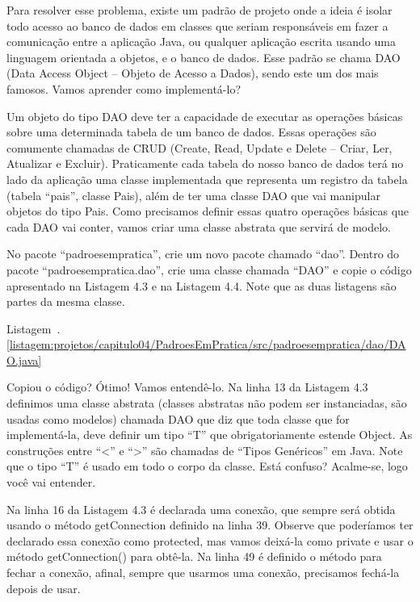 Para resolver esse problema, existe um padrão de projeto onde a ideia é isolar todo acesso ao banco de dados em classes que seriam responsáveis em fazer a comunicação entre a aplicação Java, ou qualquer aplicação escrita usando uma linguagem orientada a objetos, e o banco de dados. Esse padrão se chama DAO (Data Access Object – Objeto de Acesso a Dados), sendo este um dos mais famosos. Vamos aprender como implementá-lo?

Um objeto do tipo DAO deve ter a capacidade de executar as operações básicas sobre uma determinada tabela de um banco de dados. Essas operações são comumente chamadas de CRUD (Create, Read, Update e Delete – Criar, Ler, Atualizar e Excluir). Praticamente cada tabela do nosso banco de dados terá no lado da aplicação uma classe implementada que representa um registro da tabela (tabela ``pais'', classe Pais), além de ter uma classe DAO que vai manipular objetos do tipo Pais. Como precisamos definir essas quatro operações básicas que cada DAO vai conter, vamos criar uma classe abstrata que servirá de modelo.

No pacote ``padroesempratica'', crie um novo pacote chamado ``dao''. Dentro do pacote ``padroesempratica.dao'', crie uma classe chamada ``DAO'' e copie o código apresentado na Listagem 4.3 e na Listagem 4.4. Note que as duas listagens são partes da mesma classe.


Listagem~\thechapter.\ref{listagem:projetos/capitulo04/PadroesEmPratica/src/padroesempratica/dao/DAO.java}


Copiou o código? Ótimo! Vamos entendê-lo. Na linha 13 da Listagem 4.3 definimos uma classe abstrata (classes abstratas não podem ser instanciadas, são usadas como modelos) chamada DAO que diz que toda classe que for implementá-la, deve definir um tipo ``T'' que obrigatoriamente estende Object. As construções entre ``<'' e ``>'' são chamadas de ``Tipos Genéricos'' em Java. Note que o tipo ``T'' é usado em todo o corpo da classe. Está confuso? Acalme-se, logo você vai entender.

Na linha 16 da Listagem 4.3 é declarada uma conexão, que sempre será obtida usando o método getConnection definido na linha 39. Observe que poderíamos ter declarado essa conexão como protected, mas vamos deixá-la como private e usar o método getConnection() para obtê-la. Na linha 49 é definido o método para fechar a conexão, afinal, sempre que usarmos uma conexão, precisamos fechá-la depois de usar.


